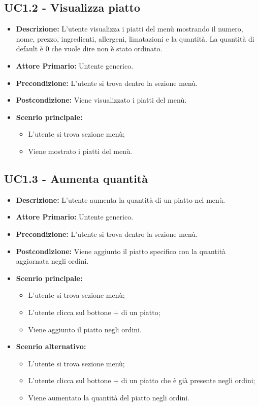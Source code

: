 \subsection{UC1.2 - Visualizza piatto}
\begin{itemize}
    \item \textbf{Descrizione:} L'utente visualizza i piatti del menù mostrando il numero, nome, prezzo, ingredienti\gl{}, allergeni, limatazioni\gl{} e la quantità. La quantità di default\gl{} è 0 che vuole dire non è stato ordinato.
    \item \textbf{Attore Primario:} Untente generico.
    \item \textbf{Precondizione:} L'utente si trova dentro la sezione menù.
    \item \textbf{Postcondizione:} Viene visualizzato i piatti del menù.
    \item \textbf{Scenrio principale:}  
    \begin{itemize}
        \item L'utente si trova sezione menù;
        \item Viene mostrato i piatti del menù.
    \end{itemize}
\end{itemize}
\subsection{UC1.3 - Aumenta quantità}
\begin{itemize}
    \item \textbf{Descrizione:} L'utente aumenta la quantità di un piatto nel menù.
    \item \textbf{Attore Primario:} Untente generico.
    \item \textbf{Precondizione:} L'utente si trova dentro la sezione menù.
    \item \textbf{Postcondizione:} Viene aggiunto il piatto specifico con la quantità aggiornata negli ordini.
    \item \textbf{Scenrio principale:}
    \begin{itemize}
        \item L'utente si trova sezione menù;
        \item L'utente clicca sul bottone + di un piatto;
        \item Viene aggiunto il piatto negli ordini.
    \end{itemize}
    \item \textbf{Scenrio alternativo:}
    \begin{itemize}
        \item L'utente si trova sezione menù;
        \item L'utente clicca sul bottone + di un piatto che è già presente negli ordini;
        \item Viene aumentato la quantità del piatto negli ordini.
    \end{itemize}
\end{itemize}
